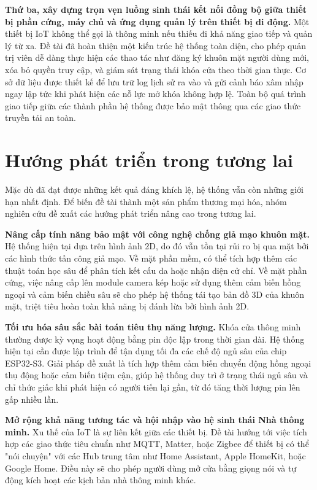 \textbf{Thứ ba, xây dựng trọn vẹn luồng sinh thái kết nối đồng bộ giữa thiết bị phần cứng, máy chủ và ứng dụng quản lý trên thiết bị di động.} Một thiết bị IoT không thể gọi là thông minh nếu thiếu đi khả năng giao tiếp và quản lý từ xa. Đề tài đã hoàn thiện một kiến trúc hệ thống toàn diện, cho phép quản trị viên dễ dàng thực hiện các thao tác như đăng ký khuôn mặt người dùng mới, xóa bỏ quyền truy cập, và giám sát trạng thái khóa cửa theo thời gian thực. Cơ sở dữ liệu được thiết kế để lưu trữ log lịch sử ra vào và gửi cảnh báo xâm nhập ngay lập tức khi phát hiện các nỗ lực mở khóa không hợp lệ. Toàn bộ quá trình giao tiếp giữa các thành phần hệ thống được bảo mật thông qua các giao thức truyền tải an toàn.

\section{Hướng phát triển trong tương lai}

Mặc dù đã đạt được những kết quả đáng khích lệ, hệ thống vẫn còn những giới hạn nhất định. Để biến đề tài thành một sản phẩm thương mại hóa, nhóm nghiên cứu đề xuất các hướng phát triển nâng cao trong tương lai.

\textbf{Nâng cấp tính năng bảo mật với công nghệ chống giả mạo khuôn mặt.} Hệ thống hiện tại dựa trên hình ảnh 2D, do đó vẫn tồn tại rủi ro bị qua mặt bởi các hình thức tấn công giả mạo. Về mặt phần mềm, có thể tích hợp thêm các thuật toán học sâu để phân tích kết cấu da hoặc nhận diện cử chỉ. Về mặt phần cứng, việc nâng cấp lên module camera kép hoặc sử dụng thêm cảm biến hồng ngoại và cảm biến chiều sâu sẽ cho phép hệ thống tái tạo bản đồ 3D của khuôn mặt, triệt tiêu hoàn toàn khả năng bị đánh lừa bởi hình ảnh 2D.

\textbf{Tối ưu hóa sâu sắc bài toán tiêu thụ năng lượng.} Khóa cửa thông minh thường được kỳ vọng hoạt động bằng pin độc lập trong thời gian dài. Hệ thống hiện tại cần được lập trình để tận dụng tối đa các chế độ ngủ sâu của chip ESP32-S3. Giải pháp đề xuất là tích hợp thêm cảm biến chuyển động hồng ngoại thụ động hoặc cảm biến tiệm cận, giúp hệ thống duy trì ở trạng thái ngủ sâu và chỉ thức giấc khi phát hiện có người tiến lại gần, từ đó tăng thời lượng pin lên gấp nhiều lần.

\textbf{Mở rộng khả năng tương tác và hội nhập vào hệ sinh thái Nhà thông minh.} Xu thế của IoT là sự liên kết giữa các thiết bị. Đề tài hướng tới việc tích hợp các giao thức tiêu chuẩn như MQTT, Matter, hoặc Zigbee để thiết bị có thể "nói chuyện" với các Hub trung tâm như Home Assistant, Apple HomeKit, hoặc Google Home. Điều này sẽ cho phép người dùng mở cửa bằng giọng nói và tự động kích hoạt các kịch bản nhà thông minh khác.

